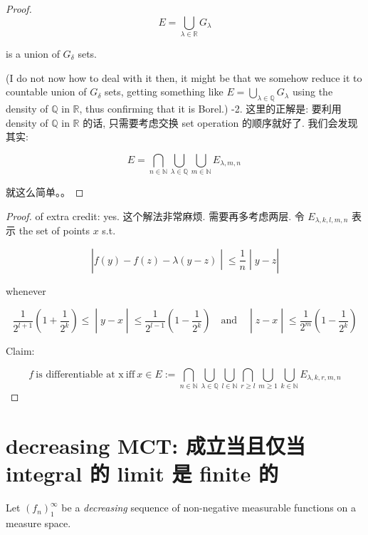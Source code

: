 \documentclass{qlnotes-export}
\begin{document}
\begin{proof}
\[E = \bigcup\limits_{\lambda \in {\mathbb{R}}}G_{\lambda}\]

is a union of \(G_{\delta}\) sets.

(I do not now how to deal with it then, it might be that we somehow reduce it to countable union of \(G_{\delta}\) sets, getting something like \(E = \bigcup_{\lambda \in {\mathbb{Q}}}G_{\lambda}\) using the density of \(\mathbb{Q}\) in \(\mathbb{R}\), thus confirming that it is Borel.) -2. 这里的正解是: 要利用 density of \(\mathbb{Q}\) in \(\mathbb{R}\) 的话, 只需要考虑交换 set operation 的顺序就好了. 我们会发现其实:

\[E = \bigcap\limits_{n \in {\mathbb{N}}}\bigcup\limits_{\lambda \in {\mathbb{Q}}}\bigcup\limits_{m \in {\mathbb{N}}}E_{\lambda,m,n}\,\]

就这么简单。。

\end{proof}

\begin{proof}

of extra credit: yes. 这个解法非常麻烦. 需要再多考虑两层. 令 \(E_{\lambda,k,l,m,n}\) 表示 the set of points \(x\) s.t.

\[\left. |f(y) - f(z) - \lambda(y - z) \middle| \leq \frac{1}{n} \middle| y - z| \right.\]

whenever

\[\left. \frac{1}{2^{l + 1}}(1 + \frac{1}{2^{k}}) \leq \middle| y - x \middle| \leq \frac{1}{2^{l - 1}}(1 - \frac{1}{2^{k}})\quad\text{and}\quad \middle| z - x \middle| \leq \frac{1}{2^{m}}(1 - \frac{1}{2^{k}}) \right.\]

Claim:

\[f\ \text{is differentiable at x}\ \text{iff}\ x \in E := \bigcap\limits_{n \in {\mathbb{N}}}\bigcup\limits_{\lambda \in {\mathbb{Q}}}\bigcup\limits_{l \in {\mathbb{N}}}\bigcap\limits_{r \geq l}\bigcup\limits_{m \geq 1}\bigcup\limits_{k \in {\mathbb{N}}}E_{\lambda,k,r,m,n}\]

\end{proof}

\section{decreasing MCT: 成立当且仅当 integral 的 limit 是 finite 的}\label{decreasing-mct-ux6210ux7acbux5f53ux4e14ux4ec5ux5f53-integral-ux7684-limit-ux662f-finite-ux7684}

Let \((f_{n})_{1}^{\infty}\) be a \emph{decreasing} sequence of non-negative measurable functions on a measure space.
\end{document}
